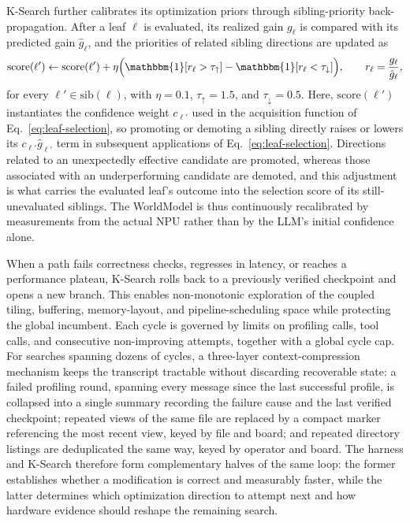 K-Search further calibrates its optimization priors through sibling-priority back-propagation. After a leaf $\ell$ is evaluated, its realized gain $g_{\ell}$ is compared with its predicted gain $\hat{g}_{\ell}$, and the priorities of related sibling directions are updated as
\begin{equation}
\mathrm{score}(\ell')\leftarrow\mathrm{score}(\ell')
+\eta\Big(
\mathbbm{1}[r_{\ell}>\tau_{\uparrow}]
-\mathbbm{1}[r_{\ell}<\tau_{\downarrow}]
\Big),
\qquad
r_{\ell}=\frac{g_{\ell}}{\hat{g}_{\ell}},
\label{eq:sibling-update}
\end{equation}
for every $\ell'\in\mathrm{sib}(\ell)$, with $\eta=0.1$, $\tau_{\uparrow}=1.5$, and $\tau_{\downarrow}=0.5$. Here, $\mathrm{score}(\ell')$ instantiates the confidence weight $c_{\ell'}$ used in the acquisition function of Eq.~\eqref{eq:leaf-selection}, so promoting or demoting a sibling directly raises or lowers its $c_{\ell'}\hat{g}_{\ell'}$ term in subsequent applications of Eq.~\eqref{eq:leaf-selection}. Directions related to an unexpectedly effective candidate are promoted, whereas those associated with an underperforming candidate are demoted, and this adjustment is what carries the evaluated leaf's outcome into the selection score of its still-unevaluated siblings. The WorldModel is thus continuously recalibrated by measurements from the actual NPU rather than by the LLM's initial confidence alone.

When a path fails correctness checks, regresses in latency, or reaches a performance plateau, K-Search rolls back to a previously verified checkpoint and opens a new branch. This enables non-monotonic exploration of the coupled tiling, buffering, memory-layout, and pipeline-scheduling space while protecting the global incumbent. Each cycle is governed by limits on profiling calls, tool calls, and consecutive non-improving attempts, together with a global cycle cap. For searches spanning dozens of cycles, a three-layer context-compression mechanism keeps the transcript tractable without discarding recoverable state: a failed profiling round, spanning every message since the last successful profile, is collapsed into a single summary recording the failure cause and the last verified checkpoint; repeated views of the same file are replaced by a compact marker referencing the most recent view, keyed by file and board; and repeated directory listings are deduplicated the same way, keyed by operator and board. The harness and K-Search therefore form complementary halves of the same loop: the former establishes whether a modification is correct and measurably faster, while the latter determines which optimization direction to attempt next and how hardware evidence should reshape the remaining search.

